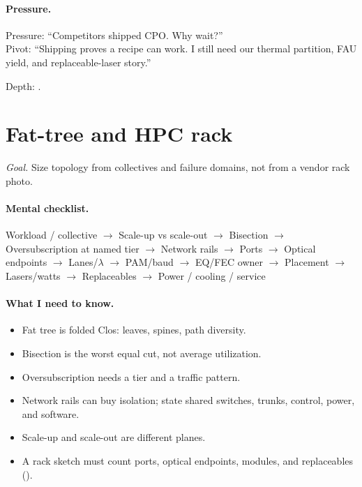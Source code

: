 \paragraph{Pressure.}
Pressure: ``Competitors shipped CPO. Why wait?''\\
Pivot: ``Shipping proves a recipe can work. I still need our thermal partition,
FAU yield, and replaceable-laser story.''

\footnotesize Depth: .

\clearpage
\section{Fat-tree and HPC rack}
\label{sec:cheat-hpc}

\textit{Goal.} Size topology from collectives and failure domains, not from a
vendor rack photo.

\paragraph{Mental checklist.}
Workload / collective $\rightarrow$ Scale-up vs scale-out $\rightarrow$
Bisection $\rightarrow$ Oversubscription at named tier $\rightarrow$ Network
rails $\rightarrow$ Ports $\rightarrow$ Optical endpoints $\rightarrow$
Lanes/$\lambda$ $\rightarrow$ PAM/baud $\rightarrow$ EQ/FEC owner
$\rightarrow$ Placement $\rightarrow$ Lasers/watts $\rightarrow$ Replaceables
$\rightarrow$ Power / cooling / service

\paragraph{What I need to know.}
\begin{itemize}
\item Fat tree is folded Clos: leaves, spines, path diversity.
\item Bisection is the worst equal cut, not average utilization.
\item Oversubscription needs a tier and a traffic pattern.
\item Network rails can buy isolation; state shared switches, trunks, control,
      power, and software.
\item Scale-up and scale-out are different planes.
\item A rack sketch must count ports, optical endpoints, modules, and
      replaceables ().
\end{itemize}

